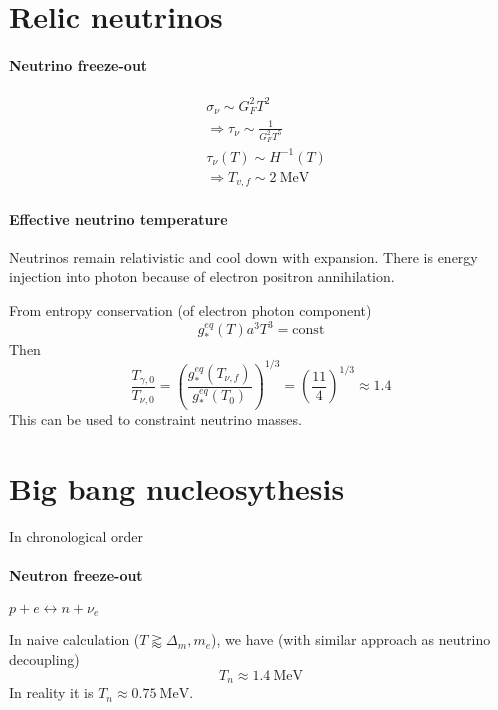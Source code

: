 \documentclass[12pt, a4paper, DIV=15]{article}
\numberwithin{equation}{section}
\begin{document}
\section{Relic neutrinos}
\paragraph{Neutrino freeze-out}
\begin{align}
   &\sigma_\nu \sim G_F^2 T^2 \\
   &\Rightarrow \tau_\nu \sim \frac{1}{G_F^2 T^5} \\
   &\tau_\nu (T) \sim H^{-1}(T)  \\
   &\Rightarrow T_{v,f} \sim \SI{2}{\mega\eV}
\end{align}

\paragraph{Effective neutrino temperature}
Neutrinos remain relativistic and cool down with expansion. There is energy injection into photon because of electron positron annihilation.

From entropy conservation (of electron photon component)
\begin{equation}
   g_*^{eq}(T) a^3 T^3 = \text{const}
\end{equation}
Then
\begin{equation}
   \frac{T_{\gamma, 0}}{T_{\nu, 0}} = \left( \frac{g_*^{eq}(T_{\nu,f})}{g_*^{eq}(T_0)} \right)^{1/3} = \left( \frac{11}{4} \right)^{1/3} \approx 1.4
\end{equation}
This can be used to constraint neutrino masses.

\section{Big bang nucleosythesis}
In chronological order

\paragraph{Neutron freeze-out}
$p + e \leftrightarrow n + \nu_e$

In naive calculation ($T \gtrapprox \Delta_m, m_e$), we have (with similar approach as neutrino decoupling)
\begin{equation}
   T_n \approx \SI{1.4}{\mega\eV} 
\end{equation}
In reality it is $T_n \approx \SI{0.75}{\mega\eV}$.
\end{document}
